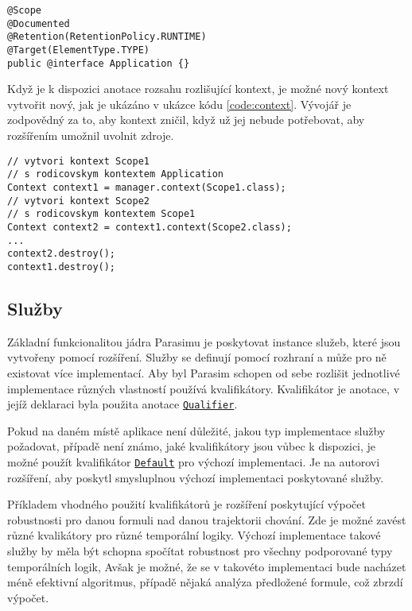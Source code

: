 \begin{lstlisting}[label={code:scope}, caption={Anotace rozsahu}]
@Scope
@Documented
@Retention(RetentionPolicy.RUNTIME)
@Target(ElementType.TYPE)
public @interface Application {}
\end{lstlisting}

Když je k dispozici anotace rozsahu rozlišující kontext, je možné nový kontext vytvořit
nový, jak je ukázáno v ukázce kódu \ref{code:context}. Vývojář je zodpovědný za to,
aby kontext zničil, když už jej nebude potřebovat, aby roz\-ší\-ře\-ním umožnil uvolnit zdroje.

\begin{lstlisting}[label={code:context}, caption={Vytvoření kontextu}]
// vytvori kontext Scope1
// s rodicovskym kontextem Application
Context context1 = manager.context(Scope1.class); 
// vytvori kontext Scope2
// s rodicovskym kontextem Scope1
Context context2 = context1.context(Scope2.class);
...
context2.destroy();
context1.destroy();
\end{lstlisting}

\subsection{Služby}

Základní funkcionalitou jádra Parasimu je poskytovat instance služeb, které jsou
vytvořeny pomocí rozšíření. Služby se definují pomocí rozhraní a může pro ně existovat
více implementací. Aby byl Parasim schopen od sebe rozlišit jednotlivé implementace
různých vlastností používá kvalifikátory. Kva\-li\-fi\-ká\-tor je anotace, v jejíž deklaraci byla použita anotace
\href{https://github.com/sybila/parasim/blob/master/core/src/main/java/org/sybila/parasim/core/annotation/Qualifier.java}{\texttt{Qualifier}}.

Pokud na daném místě aplikace není důležité, jakou typ implementace služby požadovat,
případě není známo, jaké kvalifikátory jsou vůbec k dispozici, je možné použít kvalifikátor
\href{https://github.com/sybila/parasim/blob/master/core/src/main/java/org/sybila/parasim/core/annotation/Default.java}{\texttt{Default}}
pro výchozí implementaci. Je na autorovi rozšíření, aby poskytl smysluplnou výchozí implementaci
poskytované služby.

Příkladem vhodného použití kvalifikátorů je rozšíření poskytující
vý\-počet robustnosti pro danou formuli nad danou trajektorii chování. Zde je možné zavést
různé kvalikátory pro různé temporální logiky. Výchozí implementace takové služby
by měla být schopna spočítat robustnost pro všechny podporované typy temporálních logik,
Avšak je možné, že se v takovéto implementaci bude nacházet méně efektivní algoritmus,
případě nějaká analýza předložené formule, což zbrzdí výpočet.

